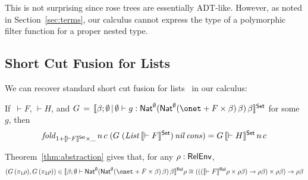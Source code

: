 \documentclass{lmcs}
\theoremstyle{plain}\newtheorem{satz}[thm]{Satz}
\newcommand{\F}{\mathcal{F}}
\begin{document}
\noindent
This is not surprising since rose trees are essentially
ADT-like. However, as noted in Section~\ref{sec:terms}, our calculus
cannot express the type of a polymorphic filter function for a proper
nested type.

\subsection{Short Cut Fusion for Lists}\label{sec:short-cut}

We can recover standard short cut fusion for lists~\cite{glp93} in our
calculus: 
\begin{thm}
If \,$\vdash F$, $\vdash H$, and 
$G \, = \, \setsem{\beta; \emptyset \,|\, \emptyset \vdash g :
  \Nat^{\emptyset} (\Nat^{\emptyset} (\onet + F \times \beta)\,
  \beta)\, \beta}$ for some $g$, then
\[\mathit{fold}_{1 + \llbracket{\vdash F}\rrbracket^{\mathsf{Set}} \times \_}\, n\, c\; (G\; (\mathit{List}\,
\llbracket{\vdash F}\rrbracket^{\mathsf{Set}})\,\mathit{nil} \,\mathit{cons}) = G \,\llbracket{\vdash
  H}\rrbracket^{\mathsf{Set}}\, n\, c \]
\end{thm}
\proof
Theorem~\ref{thm:abstraction} gives
that, for any $\rho : \mathsf{RelEnv}$,
\[(G \,(\pi_1 \rho), G\, (\pi_2 \rho))
 \in  \relsem{\beta; \emptyset \vdash \Nat^{\emptyset} (\Nat^{\emptyset}
  (\onet + F \times \beta)\, \beta)\, \beta} \rho\\
\cong (((\relsem{\vdash F} \rho \times
\rho\beta) \to \rho\beta) \times \rho\beta) \to \rho\beta\] 
%
\end{document}
